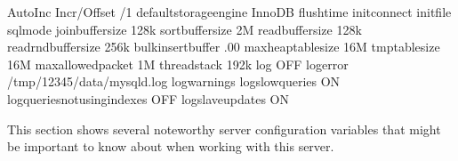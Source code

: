 \documentclass[letterpaper,10pt,english]{sphinxmanual}
\begin{document}
\begin{sphinxVerbatim}[commandchars=\\\{\}]
     Auto\PYGZhy{}Inc Incr/Offset  /1
   default\PYGZus{}storage\PYGZus{}engine  InnoDB
               flush\PYGZus{}time  
             init\PYGZus{}connect 
                init\PYGZus{}file 
                 sql\PYGZus{}mode 
         join\PYGZus{}buffer\PYGZus{}size  128k
         sort\PYGZus{}buffer\PYGZus{}size  2M
         read\PYGZus{}buffer\PYGZus{}size  128k
     read\PYGZus{}rnd\PYGZus{}buffer\PYGZus{}size  256k
       bulk\PYGZus{}insert\PYGZus{}buffer  .00
      max\PYGZus{}heap\PYGZus{}table\PYGZus{}size  16M
           tmp\PYGZus{}table\PYGZus{}size  16M
       max\PYGZus{}allowed\PYGZus{}packet  1M
             thread\PYGZus{}stack  192k
                      log  OFF
                log\PYGZus{}error  /tmp/12345/data/mysqld.log
             log\PYGZus{}warnings  
         log\PYGZus{}slow\PYGZus{}queries  ON
log\PYGZus{}queries\PYGZus{}not\PYGZus{}using\PYGZus{}indexes  OFF
        log\PYGZus{}slave\PYGZus{}updates  ON
\end{sphinxVerbatim}

This section shows several noteworthy server configuration variables that might
be important to know about when working with this server.
\end{document}
